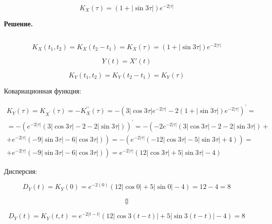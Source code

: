 \documentclass[12 pt]{article}
\begin{document}
\begin{equation}
	K_{X}(\tau)=(1+|\sin 3 \tau|) e^{-2|\tau|}
\end{equation}

\newpage
\textbf{Решение.}

\subsection{}

\begin{equation}
	K_{X}\left(t_{1}, t_{2}\right)=K_{X}\left(t_{2}-t_{1}\right)=K_{X}(\tau)=(1+|\sin 3 \tau|) e^{-2|\tau|}
\end{equation}

\begin{equation}
	Y(t) = X'(t)
\end{equation}


\begin{equation}
	K_{Y}\left(t_{1}, t_{2}\right)=K_{Y}\left(t_{2}-t_{1}\right)=K_{Y}(\tau)
\end{equation}

Ковариационная функция:

\begin{equation}
	\begin{array}{l}
	K_{Y}(\tau)=K_{X^{\prime}}(\tau)=-K_{X}^{\prime \prime}(\tau)=-\left(3|\cos 3 \tau| e^{-2|\tau|}-2(1+|\sin 3 \tau|) e^{-2|\tau|}\right)^{\prime}= \\
	=-\left(e^{-2|\tau|}(3|\cos 3 \tau|-2-2|\sin 3 \tau|)\right)^{\prime}=-\left(-2 e^{-2|\tau|}(3|\cos 3 \tau|-2-2|\sin 3 \tau|)+\right. \\
	\left.+e^{-2|\tau|}(-9|\sin 3 \tau|-6|\cos 3 \tau|)\right)=-\left(e^{-2|\tau|}(-12|\cos 3 \tau|-5|\sin 3 \tau|+4)\right)= \\
	\left.+e^{-2|\tau|}(-9|\sin 3 \tau|-6|\cos 3 \tau|)\right)=e^{-2|\tau|}(12|\cos 3 \tau|+5|\sin 3 \tau|-4)
	\end{array}
\end{equation}

Дисперсия:

\begin{equation}
	D_{Y}(t)=K_{Y}(0)=e^{-2(0)}(12|\cos 0|+5|\sin 0|-4)=12-4=8
\end{equation}

\begin{equation*}
\Updownarrow
\end{equation*}

\begin{equation}
	D_{Y}(t)=K_{Y}(t, t)=e^{-2|t-t|}(12|\cos 3(t-t)|+5|\sin 3(t-t)|-4)=8
\end{equation}
\end{document}

